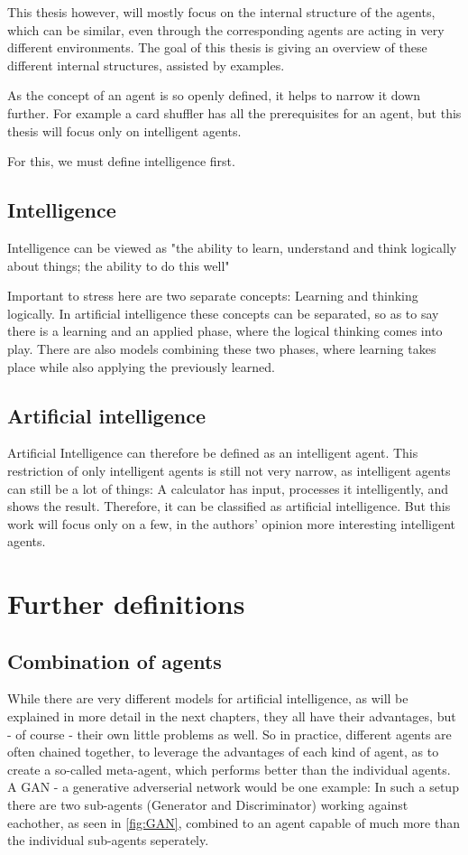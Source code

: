 This thesis however, will mostly focus on the internal structure of the agents, which can be similar, even through the corresponding agents are acting in very different environments.
The goal of this thesis is giving an overview of these different internal structures, assisted by examples.

As the concept of an agent is so openly defined, it helps to narrow it down further. For example a card shuffler has all the prerequisites for an agent, but this thesis will focus only on intelligent agents.

For this, we must define intelligence first.
\subsection{Intelligence}
Intelligence can be viewed as "the ability to learn, understand and think logically about things; the ability to do this well" 
\cite{intelligence}

Important to stress here are two separate concepts: Learning and thinking logically.
In artificial intelligence these concepts can be separated, so as to say there is a learning and an applied phase, where the logical thinking comes into play. %
There are also models combining these two phases, where learning takes place while also applying the previously learned. 

\subsection{Artificial intelligence}
Artificial Intelligence can therefore be defined as an intelligent agent.
This restriction of only intelligent agents is still not very narrow, as intelligent agents can still be a lot of things: A calculator has input, processes it intelligently, and shows the result. Therefore, it can be classified as artificial intelligence. But this work will focus only on a few, in the authors' opinion more interesting intelligent agents.

\section{Further definitions}
\subsection{Combination of agents}
While there are very different models for artificial intelligence, as will be explained in more detail in the next chapters, they all have their advantages, but - of course - their own little problems as well. So in practice, different agents are often chained together, to leverage the advantages of each kind of agent, as to create a so-called meta-agent, which performs better than the individual agents.
A GAN - a generative adverserial network would be one example: In such a setup there are two sub-agents (Generator and Discriminator) working against eachother, as seen in \autoref{fig:GAN}, combined to an agent capable of much more than the individual sub-agents seperately.

